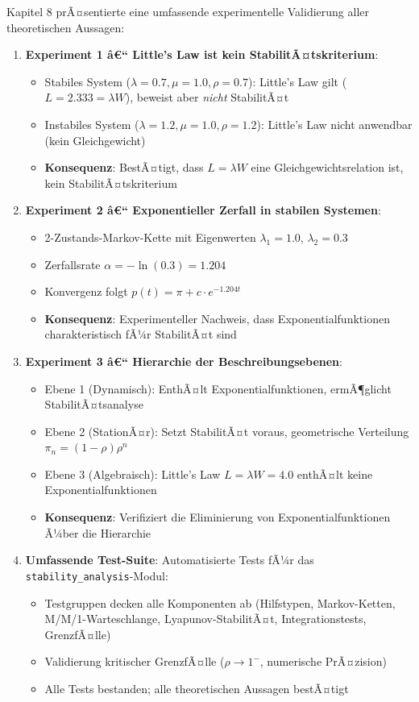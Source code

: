 ﻿\documentclass[a4paper,12pt]{scrreprt}
\theoremstyle{definition}
\begin{document}
Kapitel 8 prÃ¤sentierte eine umfassende experimentelle Validierung aller theoretischen Aussagen:

\begin{enumerate}
	\item[-] \textbf{Experiment 1 â€“ Little's Law ist kein StabilitÃ¤tskriterium}:
	\begin{itemize}
		\item[-] Stabiles System ($\lambda = 0.7, \mu = 1.0, \rho = 0.7$): Little's Law gilt ($L = 2.333 = \lambda W$), beweist aber \textit{nicht} StabilitÃ¤t
		\item[-] Instabiles System ($\lambda = 1.2, \mu = 1.0, \rho = 1.2$): Little's Law nicht anwendbar (kein Gleichgewicht)
		\item[-] \textbf{Konsequenz}: BestÃ¤tigt, dass $L = \lambda W$ eine Gleichgewichtsrelation ist, kein StabilitÃ¤tskriterium
	\end{itemize}
	
	\item[-] \textbf{Experiment 2 â€“ Exponentieller Zerfall in stabilen Systemen}:
	\begin{itemize}
		\item[-] 2-Zustands-Markov-Kette mit Eigenwerten $\lambda_1 = 1.0$, $\lambda_2 = 0.3$
		\item[-] Zerfallsrate $\alpha = -\ln(0.3) = 1.204$
		\item[-] Konvergenz folgt $p(t) = \pi + c \cdot e^{-1.204t}$
		\item[-] \textbf{Konsequenz}: Experimenteller Nachweis, dass Exponentialfunktionen charakteristisch fÃ¼r StabilitÃ¤t sind
	\end{itemize}
	
	\item[-] \textbf{Experiment 3 â€“ Hierarchie der Beschreibungsebenen}:
	\begin{itemize}
		\item[-] Ebene 1 (Dynamisch): EnthÃ¤lt Exponentialfunktionen, ermÃ¶glicht StabilitÃ¤tsanalyse
		\item[-] Ebene 2 (StationÃ¤r): Setzt StabilitÃ¤t voraus, geometrische Verteilung $\pi_n = (1-\rho)\rho^n$
		\item[-] Ebene 3 (Algebraisch): Little's Law $L = \lambda W = 4.0$ enthÃ¤lt keine Exponentialfunktionen
		\item[-] \textbf{Konsequenz}: Verifiziert die Eliminierung von Exponentialfunktionen Ã¼ber die Hierarchie
	\end{itemize}
	
	\item[-] \textbf{Umfassende Test-Suite}: Automatisierte Tests fÃ¼r das
	\texttt{stability\_analysis}-Modul:
	\begin{itemize}
		\item[-] Testgruppen decken alle Komponenten ab (Hilfstypen,
		Markov-Ketten, M/M/1-Warteschlange, Lyapunov-StabilitÃ¤t,
		Integrationstests, GrenzfÃ¤lle)
		\item[-] Validierung kritischer GrenzfÃ¤lle ($\rho \to 1^-$,
		numerische PrÃ¤zision)
		\item[-] Alle Tests bestanden; alle theoretischen Aussagen bestÃ¤tigt
	\end{itemize}
\end{enumerate}
\end{document}
